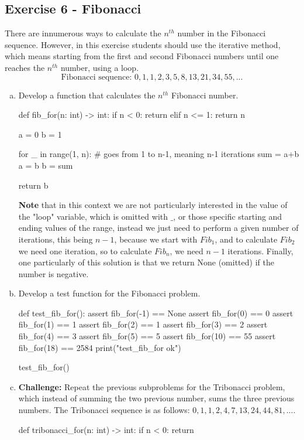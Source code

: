 \documentclass[12pt]{article}
\begin{document}
\subsection*{Exercise 6 - Fibonacci}
There are innumerous ways to calculate the $n^{th}$ number in the Fibonacci 
sequence. However, in this exercise students should use the iterative method, 
which means starting from the first and second Fibonacci numbers until one
reaches the $n^{th}$ number, using a loop.
\[\text{Fibonacci sequence: } 0, 1, 1, 2, 3, 5, 8, 13, 21, 34, 55, ...\]
\begin{enumerate}[a)]
  \item Develop a function that calculates the $n^{th}$ Fibonacci number.
\begin{pythonlst}
def fib_for(n: int) -> int:
  if n < 0:
    return
  elif n <= 1:
    return n

  a = 0
  b = 1

  for _ in range(1, n): # goes from 1 to n-1, meaning n-1 iterations
    sum = a+b
    a = b
    b = sum

  return b
\end{pythonlst}

\textbf{Note} that in this context we are not particularly interested in the
value of the "loop" variable, which is omitted with $\_$, or those specific 
starting and ending values of the range, instead we just need to perform a given 
number of iterations, this being $n-1$, because we start with $Fib_{1}$, and to
calculate $Fib_{2}$ we need one iteration, so to calculate $Fib_{n}$, we need 
$n-1$ iterations. Finally, one particularly of this solution is that we return 
None (omitted) if the number is negative.
  \item Develop a test function for the Fibonacci problem.
\begin{pythonlst}
def test_fib_for():
  assert fib_for(-1) == None
  assert fib_for(0) == 0 
  assert fib_for(1) == 1
  assert fib_for(2) == 1
  assert fib_for(3) == 2
  assert fib_for(4) == 3
  assert fib_for(5) == 5
  assert fib_for(10) == 55
  assert fib_for(18) == 2584
  print("test_fib_for ok")

test_fib_for()
\end{pythonlst}
  \item \textbf{Challenge:} Repeat the previous subproblems for the Tribonacci 
    problem, which instead of summing the two previous number, sums the three
    previous numbers. The Tribonacci sequence is as follows: $0, 1, 1, 2, 4, 7,
    13, 24, 44, 81, ...$.
\begin{pythonlst}
def tribonacci_for(n: int) -> int:
  if n < 0:
    return
  

\end{pythonlst}
\end{enumerate}
\end{document}
